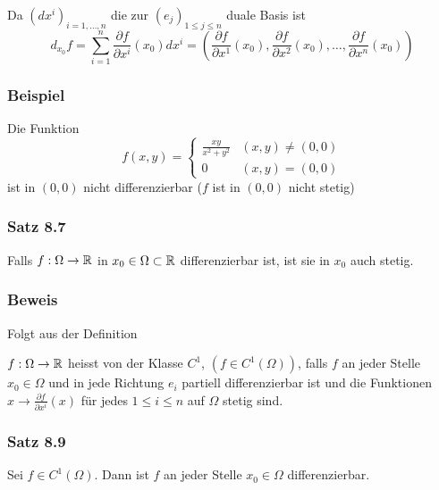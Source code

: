 Da $\left( dx^i\right)_{i=1,\dots,n}$ die zur $\left( e_j\right)_{1\leq j\leq n}$ duale Basis ist \[{d_{{x_0}}}f = \sum\limits_{i = 1}^n {\frac{{\partial f}}{{\partial {x^i}}}\left( {{x_0}} \right)d{x^i} = \left( {\frac{{\partial f}}{{\partial {x^1}}}\left( {{x_0}} \right),\frac{{\partial f}}{{\partial {x^2}}}\left( {{x_0}} \right), \ldots ,\frac{{\partial f}}{{\partial {x^n}}}\left( {{x_0}} \right)} \right)} \]

\subsubsection*{Beispiel}
Die Funktion \[f\left( {x,y} \right) = \left\{ {\begin{array}{*{20}{c}}
{\frac{{xy}}{{{x^2} + {y^2}}}}&{\left( {x,y} \right)\not  = \left( {0,0} \right)}\\
0&{\left( {x,y} \right) = \left( {0,0} \right)}
\end{array}} \right.\] ist in $\left( 0,0\right)$ nicht differenzierbar ($f$ ist  in $\left( 0,0\right)$ nicht stetig)

\subsubsection*{Satz 8.7}
Falls $f:\Omega\to\mathbb{R}$ in $x_0\in\Omega\subset\mathbb{R}$ differenzierbar ist, ist sie in $x_0$ auch stetig.

\subsubsection*{Beweis}
Folgt aus der Definition
\begin{definition}{8.8}
$f:\Omega\to\mathbb{R}$ heisst von der Klasse $C^1$, $\left( f\in C^1\left(\Omega\right)\right)$, falls $f$ an jeder Stelle $x_0\in\Omega$ und in jede Richtung $e_i$ partiell differenzierbar ist und die Funktionen $x\to\frac{\partial f}{\partial x^i}\left(x\right)$ für jedes $1\leq i\leq n$ auf $\Omega$ stetig sind.
\end{definition}
\subsubsection*{Satz 8.9}
Sei $f\in C^1\left(\Omega\right)$. Dann ist $f$ an jeder Stelle $x_0\in\Omega$ differenzierbar.


